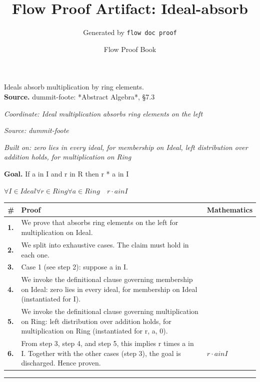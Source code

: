 \documentclass[11pt]{article}
\title{Flow Proof Artifact: Ideal-absorb}
\author{Generated by \texttt{flow doc proof}}
\date{Flow Proof Book}
\theoremstyle{definition}
\begin{document}
\maketitle
Ideals absorb multiplication by ring elements.\\[0.5em]
\textbf{Source.} dummit-foote: *Abstract Algebra*, §7.3\\[0.5em]
\bigskip
{}\par
\smallskip\noindent\textit{Coordinate: Ideal \cdot multiplication \cdot absorbs ring elements on the left}\par
\smallskip\noindent\textit{Source: dummit-foote}\par
\smallskip\noindent\textit{Built on: zero lies in every ideal, for membership on Ideal, left distribution over addition holds, for multiplication on Ring}\par
\medskip
\noindent\textbf{Goal.} If a in I and r in R then r * a in I\par
\noindent$\displaystyle \forall I \in Ideal \forall r \in Ring \forall a \in Ring\quad r \cdot a in I$\par
\medskip
\noindent
\begin{tabular}{@{} >{\raggedright\arraybackslash}p{} >{\raggedright\arraybackslash}p{} >{\raggedleft\arraybackslash}p{} @{}}
\textbf{\#} & \textbf{Proof} & \textbf{Mathematics} \\
\midrule
\textbf{1.} & We prove that absorbs ring elements on the left for multiplication on Ideal. & \\[0.45em]
\textbf{2.} & We split into exhaustive cases. The claim must hold in each one. & \\[0.45em]
\textbf{3.} & Case 1 (see step 2): suppose a in I. & \\[0.45em]
\textbf{4.} & We invoke the definitional clause governing membership on Ideal: zero lies in every ideal, for membership on Ideal (instantiated for I). & \\[0.45em]
\textbf{5.} & We invoke the definitional clause governing multiplication on Ring: left distribution over addition holds, for multiplication on Ring (instantiated for r, a, 0). & \\[0.45em]
\textbf{6.} & From step 3, step 4, and step 5, this implies r times a in I. Together with the other cases (step 3), the goal is discharged. Hence proven. & $\displaystyle r \cdot a in I$ \\[0.45em]
\bottomrule
\end{tabular}
\label{thm:Ideal-multiplication-absorbs_ring_elements_on_the_left}
\par\medskip\hrule
\end{document}
